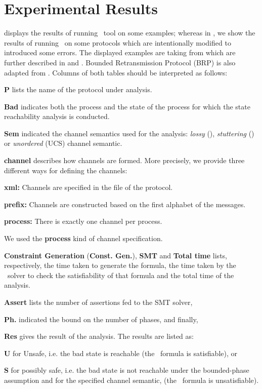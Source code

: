 \section{Experimental Results}

 displays the results of running \MPass\ tool on  some examples;
whereas in , we show the  results of running \MPass\ on some protocols which are intentionally modified to introduced some errors.
The displayed  examples are   taking  from \cite{JRSVgit}  which are further described in \cite{MPSV11} and \cite{RSV11}.
Bounded Retransmission Protocol (BRP) is also adapted from \cite{AABJ04}.
Columns of both tables should be interpreted as follows:

\begin{inparaenum}
\item {\bf P} lists the name of the protocol under analysis.
\item {\bf Bad} indicates both the process and the state of the process for which the state reachability analysis is conducted.
\item {\bf Sem} indicated the channel semantics used for the analysis: \textit{lossy} (\LCS), \textit{stuttering} (\SLCS) or \textit{unordered} (UCS) channel semantic.
\item {\bf channel} describes how channels are formed.  More precisely, we provide three different ways for defining the channels:
\begin{inparaenum}
\item {\bf xml:}  Channels are specified in the \xml file of the protocol.
\item {\bf prefix:} Channels are constructed based on the first alphabet of the messages.
\item {\bf process:} There is exactly one channel per process.
\end{inparaenum}
We used the \textbf{process} kind of channel specification.
\item {\bf Constraint Generation} (\textbf{Const. Gen.}), \textbf{SMT} and {\bf Total time} lists, respectively, the time taken to generate  the \smt\-formula,
the time taken by the \smt\ solver to check the satisfiability of that formula and the total time of the analysis.
\item {\bf Assert} lists the number of assertions fed to the SMT solver,
\item {\bf Ph.} indicated the bound on the number of phases, and finally,
\item {\bf Res} gives the result of the analysis. The results are listed as:
\begin{inparaenum}
\item {\bf U} for Unsafe, i.e. the bad state is reachable (the \smt\ formula is satisfiable), or
\item {\bf S} for possibly safe, i.e. the bad state is not reachable under the bounded-phase assumption and for the specified channel semantic,
(the \smt\ formula is unsatisfiable).
\end{inparaenum}
\end{inparaenum}

